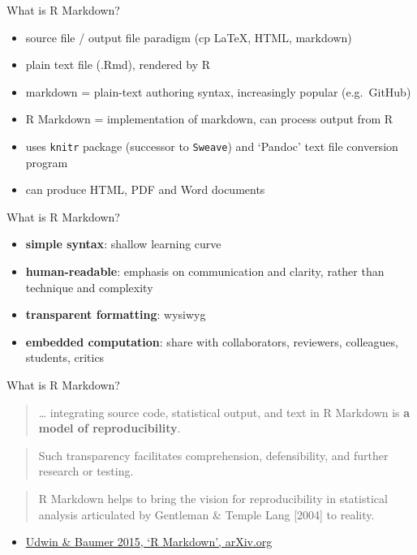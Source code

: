 \documentclass[ignorenonframetext,]{beamer}
\begin{document}
\begin{frame}{What is R Markdown?}

\begin{itemize}[<+->]
\itemsep1pt\parskip0pt
\item
  source file / output file paradigm (cp LaTeX, HTML, markdown)
\item
  plain text file (.Rmd), rendered by R
\item
  markdown = plain-text authoring syntax, increasingly popular
  (e.g.~GitHub)
\item
  R Markdown = implementation of markdown, can process output from R
\item
  uses \texttt{knitr} package (successor to \texttt{Sweave}) and
  `Pandoc' text file conversion program
\item
  can produce HTML, PDF and Word documents
\end{itemize}

\end{frame}

\begin{frame}{What is R Markdown?}

\begin{itemize}[<+->]
\itemsep1pt\parskip0pt
\item
  \textbf{simple syntax}: shallow learning curve
\item
  \textbf{human-readable}: emphasis on communication and clarity, rather
  than technique and complexity
\item
  \textbf{transparent formatting}: wysiwyg
\item
  \textbf{embedded computation}: share with collaborators, reviewers,
  colleagues, students, critics
\end{itemize}

\end{frame}

\begin{frame}{What is R Markdown?}

\begin{quote}
\ldots{} integrating source code, statistical output, and text in R
Markdown is \textbf{a model of reproducibility}.
\end{quote}

\begin{quote}
Such transparency facilitates comprehension, defensibility, and further
research or testing.
\end{quote}

\begin{quote}
R Markdown helps to bring the vision for reproducibility in statistical
analysis articulated by Gentleman \& Temple Lang {[}2004{]} to reality.
\end{quote}

\begin{itemize}[<+->]
\itemsep1pt\parskip0pt
\item
  \href{http://arxiv.org/abs/1501.01613}{Udwin \& Baumer 2015, `R
  Markdown', arXiv.org}
\end{itemize}

\end{frame}
\end{document}
